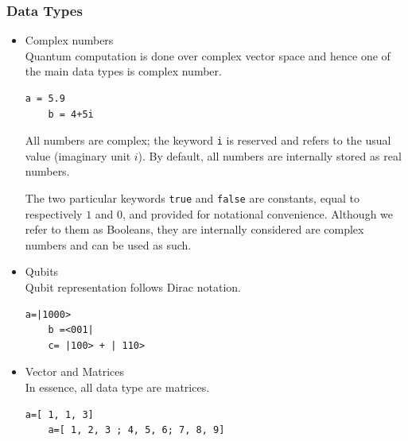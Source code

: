 \documentclass[11pt]{article}
\begin{document}
\subsubsection{Data Types}

\begin{itemize}
\item Complex numbers\\
Quantum computation is done over complex vector space and hence one of the main data types  is complex number.

\begin{lstlisting}[frame=single]
	a = 5.9  
	b = 4+5i
\end{lstlisting}
All numbers are complex; the keyword \texttt{i} is reserved and refers to the usual value (imaginary unit $i$). By default, all numbers are internally stored as real numbers.  

The two particular keywords \texttt{true} and \texttt{false} are constants, equal to respectively $1$ and $0$, and provided for notational convenience. Although we refer to them as Booleans, they are internally considered are complex numbers and can be used as such.


\item Qubits \\
Qubit representation follows Dirac notation.\\

\begin{lstlisting}[frame=single]
	a=|1000>
	b =<001|
	c= |100> + | 110> 	 
\end{lstlisting}

\item Vector and Matrices \\
In essence, all data type are matrices.\\

\begin{lstlisting}[frame=single]
	a=[ 1, 1, 3]
	a=[ 1, 2, 3 ; 4, 5, 6; 7, 8, 9]
\end{lstlisting}

\end{itemize}
\end{document}
